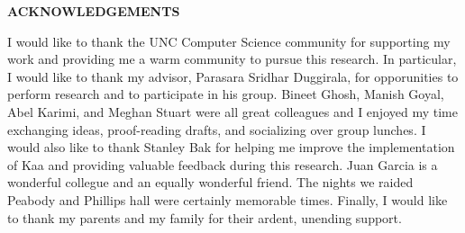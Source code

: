 
\begin{center}
\vspace*{52pt}
{\fontsize{12pt}{14.4pt}\selectfont \textbf{ACKNOWLEDGEMENTS}}
\end{center}

I would like to thank the UNC Computer Science community for supporting my work and providing me a warm community to pursue this research. In particular, I would like to thank my advisor, Parasara Sridhar Duggirala, for opporunities to perform research and to participate in his group.
%
%
Bineet Ghosh, Manish Goyal, Abel Karimi, and Meghan Stuart were all great colleagues and I enjoyed my time exchanging ideas, proof-reading drafts, and socializing over group lunches. I would also like to thank Stanley Bak for helping me improve the implementation of Kaa and providing valuable feedback during this research. Juan Garcia is a wonderful collegue and an equally wonderful friend. The nights we raided Peabody and Phillips hall were certainly memorable times. Finally, I would like to thank my parents and my family for their ardent, unending support.

\clearpage
